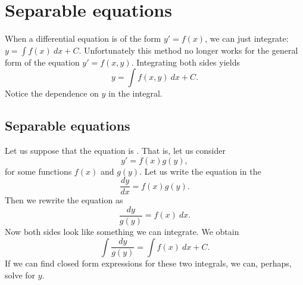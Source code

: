 \documentclass[12pt]{book}
\begin{document}
\sectionnewpage
\section{Separable equations}


When a differential equation is of the form
$y' = f(x)$,
we can just integrate:
$y = \int f(x) ~dx + C$. 
Unfortunately this method no longer works for the
general form of the equation
$y' = f(x,y)$.
Integrating both sides yields
\begin{equation*}
y = \int f(x,y) ~dx + C .
\end{equation*}
Notice the dependence on $y$ in the integral.

\subsection{Separable equations}

Let us suppose that the equation is
\emph{}.
That is, let us consider
\begin{equation*}
y' = f(x)g(y) ,
\end{equation*}
for some functions $f(x)$ and $g(y)$.
Let us write the equation in the 
\begin{equation*}
\frac{dy}{dx} = f(x)g(y) .
\end{equation*}
Then we rewrite the equation as
\begin{equation*}
\frac{dy}{g(y)} = f(x) ~dx .
\end{equation*}
Now both sides look like something we can integrate.  We obtain
\begin{equation*}
\int \frac{dy}{g(y)} = \int f(x) ~dx + C .
\end{equation*}
If we can find closed form expressions
for these two integrals, we can, perhaps, solve for $y$.
\end{document}
